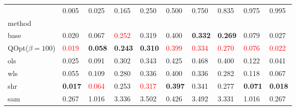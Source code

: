 \begin{tabular}{llllllllll}
\toprule
 & 0.005 & 0.025 & 0.165 & 0.250 & 0.500 & 0.750 & 0.835 & 0.975 & 0.995 \\
method &  &  &  &  &  &  &  &  &  \\
\midrule
base & 0.020 & 0.067 & \textcolor{red}{0.252} & 0.319 & 0.400 & \textbf{0.332} & \textbf{0.269} & 0.079 & 0.027 \\
\midrule
QOpt($\beta=100$) & \textcolor{red}{0.019} & \textbf{0.058} & \textbf{0.243} & \textbf{0.310} & \textcolor{red}{0.399} & \textcolor{red}{0.334} & \textcolor{red}{0.270} & \textcolor{red}{0.076} & \textcolor{red}{0.022} \\
ols & 0.025 & 0.091 & 0.302 & 0.343 & 0.425 & 0.468 & 0.400 & 0.122 & 0.041 \\
wls & 0.055 & 0.109 & 0.280 & 0.336 & 0.400 & 0.336 & 0.282 & 0.118 & 0.067 \\
shr & \textbf{0.017} & \textcolor{red}{0.064} & 0.253 & \textcolor{red}{0.317} & \textbf{0.397} & 0.341 & 0.277 & \textbf{0.071} & \textbf{0.018} \\
sam & 0.267 & 1.016 & 3.336 & 3.502 & 0.426 & 3.492 & 3.331 & 1.016 & 0.267 \\
\bottomrule
\end{tabular}